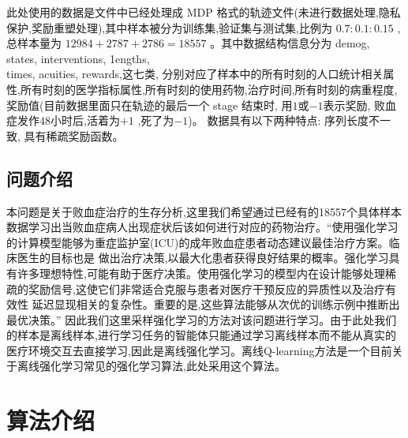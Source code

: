 \documentclass[12pt,a4paper]{ctexart}
\theoremstyle{definition}
\begin{document}
此处使用的数据是文件中已经处理成 MDP 格式的轨迹文件(未进行数据处理,隐私保护,奖励重塑处理),其中样本被分为训练集,验证集与测试集,比例为 $0.7: 0.1:0.15$ ,
总样本量为 $12984+2787+2786=18557$ 。其中数据结构信息分为 
demog, states, interventions, 1engths, \\ times, acuities, rewards,这七类,
分别对应了样本中的所有时刻的人口统计相关属性,所有时刻的医学指标属性,所有时刻的使用药物,治疗时间,所有时刻的病重程度,奖励值(目前数据里面只在轨迹的最后一个 stage 结束时,
用$1$或$-1$表示奖励, 败血症发作$48$小时后,活着为$+1$ ,死了为$-1$)。
数据具有以下两种特点: 序列长度不一致, 具有稀疏奖励函数。
\subsection{问题介绍}
本问题是关于败血症治疗的生存分析,这里我们希望通过已经有的18557个具体样本数据学习出当败血症病人出现症状后该如何进行对应的药物治疗。“使用强化学习的计算模型能够为重症监护室(ICU)的成年败血症患者动态建议最佳治疗方案。临床医生的目标也是 做出治疗决策,以最大化患者获得良好结果的概率。强化学习具有许多理想特性,可能有助于医疗决策。使用强化学习的模型内在设计能够处理稀疏的奖励信号,这使它们非常适合克服与患者对医疗干预反应的异质性以及治疗有效性 延迟显现相关的复杂性。重要的是,这些算法能够从次优的训练示例中推断出最优决策。”
因此我们这里采样强化学习的方法对该问题进行学习。由于此处我们的样本是离线样本,进行学习任务的智能体只能通过学习离线样本而不能从真实的医疗环境交互去直接学习,因此是离线强化学习。离线Q-learning方法是一个目前关于离线强化学习常见的强化学习算法,此处采用这个算法。
\section{算法介绍}
\end{document}
